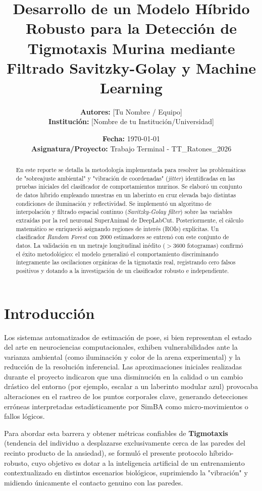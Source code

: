 \documentclass[12pt,a4paper]{article}
\title{\textbf{Desarrollo de un Modelo Híbrido Robusto para la Detección de Tigmotaxis Murina mediante Filtrado Savitzky-Golay y Machine Learning}}
\author{\textbf{Autores:} [Tu Nombre / Equipo] \\ \textbf{Institución:} [Nombre de tu Institución/Universidad]}
\date{\textbf{Fecha:} \today \\ \textbf{Asignatura/Proyecto:} Trabajo Terminal - TT\_Ratones\_2026}
\begin{document}
\maketitle
\thispagestyle{empty}
\newpage

\begin{abstract}
\noindent En este reporte se detalla la metodología implementada para resolver las problemáticas de "sobreajuste ambiental" y "vibración de coordenadas" (\textit{jitter}) identificadas en las pruebas iniciales del clasificador de comportamientos murinos. Se elaboró un conjunto de datos híbrido empleando muestras en un laberinto en cruz elevada bajo distintas condiciones de iluminación y reflectividad. Se implementó un algoritmo de interpolación y filtrado espacial continuo (\textit{Savitzky-Golay filter}) sobre las variables extraídas por la red neuronal SuperAnimal de DeepLabCut. Posteriormente, el cálculo matemático se enriqueció asignando regiones de interés (ROIs) explícitas. Un clasificador \textit{Random Forest} con 2000 estimadores se entrenó con este conjunto de datos. La validación en un metraje longitudinal inédito ($>3600$ fotogramas) confirmó el éxito metodológico: el modelo generalizó el comportamiento discriminando íntegramente las oscilaciones orgánicas de la tigmotaxis real, registrando cero falsos positivos y dotando a la investigación de un clasificador robusto e independiente.
\end{abstract}

\section{Introducción}
Los sistemas automatizados de estimación de pose, si bien representan el estado del arte en neurociencias computacionales, exhiben vulnerabilidades ante la varianza ambiental (como iluminación y color de la arena experimental) y la reducción de la resolución inferencial. Las aproximaciones iniciales realizadas durante el proyecto indicaron que una disminución en la calidad o un cambio drástico del entorno (por ejemplo, escalar a un laberinto modular azul) provocaba alteraciones en el rastreo de los puntos corporales clave, generando detecciones erróneas interpretadas estadísticamente por SimBA como micro-movimientos o fallos lógicos. 

Para abordar esta barrera y obtener métricas confiables de \textbf{Tigmotaxis} (tendencia del individuo a desplazarse exclusivamente cerca de las paredes del recinto producto de la ansiedad), se formuló el presente protocolo híbrido-robusto, cuyo objetivo es dotar a la inteligencia artificial de un entrenamiento contextualizado en distintos escenarios biológicos, suprimiendo la "vibración" y midiendo únicamente el contacto genuino con las paredes.
\end{document}
